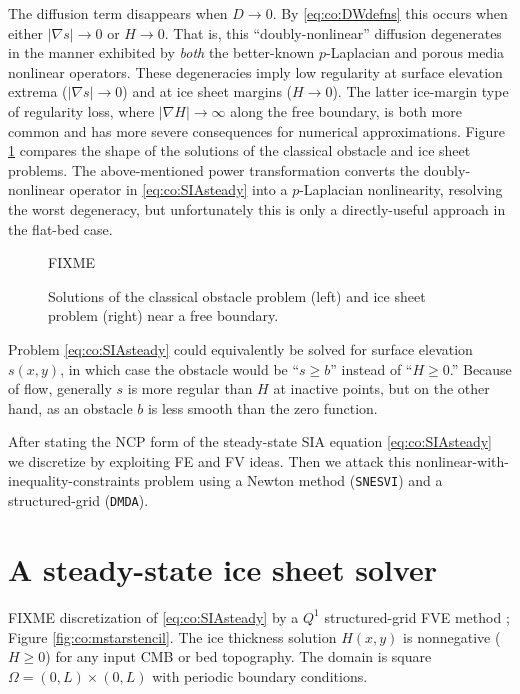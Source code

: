 \documentclass[final,leqno,onefignum,onetabnum]{siamltex1213bueler}
\renewcommand{\grad}{\nabla}
\newcommand{\pDMDA}{\texttt{DMDA}\xspace}
\newcommand{\pSNESVI}{\texttt{SNESVI}\xspace}
\begin{document}
The diffusion term disappears when $D\to 0$.  By \eqref{eq:co:DWdefns} this occurs when either $|\grad s|\to 0$ or $H\to 0$.  That is, this ``doubly-nonlinear'' diffusion degenerates in the manner exhibited by \emph{both} the better-known $p$-Laplacian and porous media nonlinear operators.  These degeneracies imply low regularity at surface elevation extrema ($|\grad s|\to 0$) and at ice sheet margins ($H \to 0$).  The latter ice-margin type of regularity loss, where $|\grad H| \to \infty$ along the free boundary, is both more common and has more severe consequences for numerical approximations.  Figure \ref{fig:co:freeboundaryshape} compares the shape of the solutions of the classical obstacle and ice sheet problems.  The above-mentioned power transformation converts the doubly-nonlinear operator in \eqref{eq:co:SIAsteady} into a $p$-Laplacian nonlinearity, resolving the worst degeneracy, but unfortunately this is only a directly-useful approach in the flat-bed case.

\begin{figure}[h]
\begin{center}
FIXME %
\end{center}
\caption{Solutions of the classical obstacle problem (left) and ice sheet problem (right) near a free boundary.}
\label{fig:co:freeboundaryshape}
\end{figure}

Problem \eqref{eq:co:SIAsteady} could equivalently be solved for surface elevation $s(x,y)$, in which case the obstacle would be ``$s\ge b$'' instead of ``$H\ge 0$.''  Because of flow, generally $s$ is more regular than $H$ at inactive points, but on the other hand, as an obstacle $b$ is less smooth than the zero function.

After stating the NCP form of the steady-state SIA equation \eqref{eq:co:SIAsteady} we discretize by exploiting FE and FV ideas.  Then we attack this nonlinear-with-inequality-constraints problem using a Newton method (\pSNESVI) and a structured-grid (\pDMDA).


\section{A steady-state ice sheet solver}

FIXME discretization of \eqref{eq:co:SIAsteady} by a $Q^1$ structured-grid FVE method \cite{Bueler2016,EwingLinLin2002}; Figure \ref{fig:co:mstarstencil}.  The ice thickness solution $H(x,y)$ is nonnegative ($H \ge 0$) for any input CMB or bed topography.  The domain is square $\Omega = (0,L) \times (0,L)$ with periodic boundary conditions.
\end{document}
